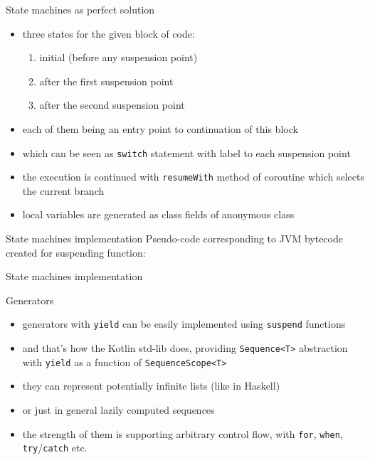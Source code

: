 \documentclass[hyperref={pdfpagelabels=false},xcolor={dvipsnames},compress,onlytextwidth]{beamer}
\begin{document}
    \begin{frame}[fragile]{State machines as perfect solution}
        \begin{itemize}
            \item three states for the given block of code:\pause
            \begin{enumerate}
                \item initial (before any suspension point)\pause
                \item after the first suspension point\pause
                \item after the second suspension point\pause
            \end{enumerate}
            \item each of them being an entry point to continuation of this block\pause
            \item which can be seen as \texttt{switch} statement with label to each suspension point\pause
            \item the execution is continued with \texttt{resumeWith} method of coroutine which selects the current branch\pause
            \item local variables are generated as class fields of anonymous class
        \end{itemize}
    \end{frame}

    \begin{frame}[fragile]{State machines implementation}
        Pseudo-code corresponding to JVM bytecode created for suspending function:
        
    \end{frame}
    \begin{frame}[fragile]{State machines implementation}
        
    \end{frame}

    \begin{frame}[fragile]{Generators}
        \begin{itemize}
            \item generators with \texttt{yield} can be easily implemented using \texttt{suspend} functions\pause
            \item and that's how the Kotlin std-lib does, providing \texttt{Sequence<T>} abstraction with \texttt{yield} as a function of \texttt{SequenceScope<T>}\pause
            \item they can represent potentially infinite lists (like in Haskell)\pause
            \item or just in general lazily computed sequences\pause
            \item the strength of them is supporting arbitrary control flow, with \texttt{for}, \texttt{when}, \texttt{try}/\texttt{catch} etc.
        \end{itemize}
    \end{frame}
\end{document}
